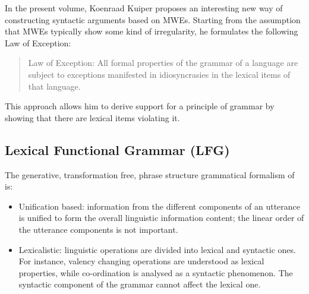 \documentclass[output=paper]{langsci/langscibook}
\begin{document}
In the present volume, Koenraad Kuiper proposes an interesting new way of constructing syntactic arguments based on MWEs. Starting from the assumption that MWEs typically show some kind of irregularity, he formulates the following Law of Exception:

\begin{quote}
Law of Exception: All formal properties of the grammar of a language are subject to exceptions manifested in idiosyncrasies in the lexical items of that language.
\end{quote}

This approach allows him to derive support for a principle of grammar by showing that there are lexical items violating it. 

\subsection{Lexical Functional Grammar (LFG)}\label{Sec-LFG}
The generative, transformation free, phrase structure grammatical formalism of  is:
\begin{itemize}
\item Unification based: information from the different components of an utterance is unified to form the overall linguistic information content; the linear order of the utterance components is not important.
\item Lexicalistic: linguistic operations are divided into lexical and syntactic ones. For instance, valency changing operations are understood as lexical properties, while co-ordination is analysed as a syntactic phenomenon. The syntactic component of the grammar cannot affect the lexical one.
\end{itemize}
\end{document}
